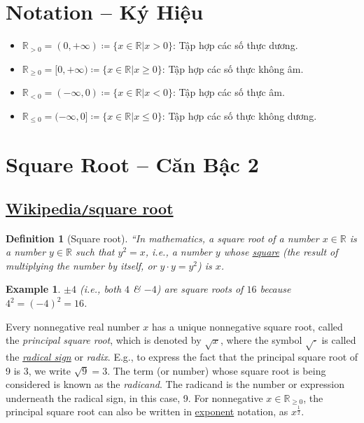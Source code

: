 \documentclass{article}
\newtheorem{definition}{Definition}
\newtheorem{example}{Example}
\begin{document}
\section*{Notation -- Ký Hiệu}
\begin{itemize}
	\item $\mathbb{R}_{> 0} = (0,+\infty)\coloneqq\{x\in\mathbb{R}|x > 0\}$: Tập hợp các số thực dương.
	\item $\mathbb{R}_{\ge0} = [0,+\infty)\coloneqq\{x\in\mathbb{R}|x\ge0\}$: Tập hợp các số thực không âm.
	\item $\mathbb{R}_{< 0} = (-\infty,0)\coloneqq\{x\in\mathbb{R}|x < 0\}$: Tập hợp các số thực âm.
	\item $\mathbb{R}_{\le0} = (-\infty,0]\coloneqq\{x\in\mathbb{R}|x\le0\}$: Tập hợp các số thực không dương.
\end{itemize}

\section{Square Root -- Căn Bậc 2}

\subsection{\href{https://en.wikipedia.org/wiki/Square_root}{Wikipedia\texttt{/}square root}}

\begin{definition}[Square root]
	``In mathematics, a \textit{square root} of a number $x\in\mathbb{R}$ is a number $y\in\mathbb{R}$ such that $y^2 = x$, i.e., a number $y$ whose \href{https://en.wikipedia.org/wiki/Square_(algebra)}{square} (the result of multiplying the number by itself, or $y\cdot y = y^2$) is $x$.
\end{definition}

\begin{example}
	$\pm4$ (i.e., both $4$ \& $-4$) are square roots of $16$ because $4^2 = (-4)^2 = 16$.
\end{example}
Every nonnegative real number $x$ has a unique nonnegative square root, called the \textit{principal square root}, which is denoted by $\sqrt{x}$, where the symbol $\sqrt{\cdot}$ is called the \href{https://en.wikipedia.org/wiki/Radical_sign}{\textit{radical sign}} or \textit{radix}. E.g., to express the fact that the principal square root of 9 is 3, we write $\sqrt{9} = 3$. The term (or number) whose square root is being considered is known as the \textit{radicand}. The radicand is the number or expression underneath the radical sign, in this case, 9. For nonnegative $x\in\mathbb{R}_{\ge0}$, the principal square root can also be written in \href{https://en.wikipedia.org/wiki/Exponentiation}{exponent} notation, as $x^{\frac{1}{2}}$.
\end{document}
